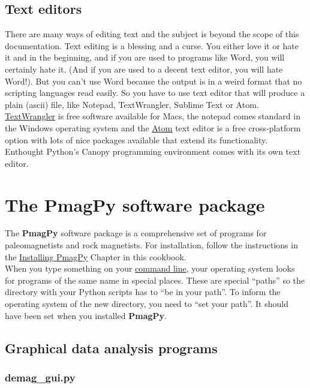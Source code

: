 \documentclass[11pt]{book}
\begin{document}
{\section{Text editors}

There are many ways of editing text and the subject is beyond the scope of this documentation. Text editing is a blessing and a curse.  You either love it or
hate it and in the beginning, and if you are used to programs like Word, you will certainly hate it. (And if you are used to a decent text editor, you will hate Word!).      But you can't use Word because the output is in a weird format that no scripting languages read easily.  So you have to use text editor that will produce a plain (ascii) file, like Notepad, TextWrangler, Sublime Text or Atom.  \href{http://textwrangler.onfreedownload.com}{TextWrangler} is free software available for Macs, the notepad comes standard in the Windows operating system and the \href{https://atom.io}{Atom} text editor is a free cross-platform option with lots of nice packages available that extend its functionality. Enthought Python's Canopy programming environment comes with its own text editor.


\chapter{The {\bf PmagPy} software package}
\label{chap:PmagPy}

The {\bf PmagPy} software package is a comprehensive set of programs for paleomagnetists and rock magnetists.  For installation,  follow the instructions in the \href{#quick_start}{Installing PmagPy} Chapter in this cookbook. \\

\noindent When you type something on your \href{#command_line}{command line}, your operating system looks for programs of the same name in special places.  These are special ``paths'' so the directory with your Python scripts has to ``be in your path''.  To inform the operating system of the new directory, you need to ``set your path''.    It should have been set when you installed {\bf PmagPy}.



\section{Graphical data analysis programs}
\subsection{demag\_gui.py}

}
\end{document}
